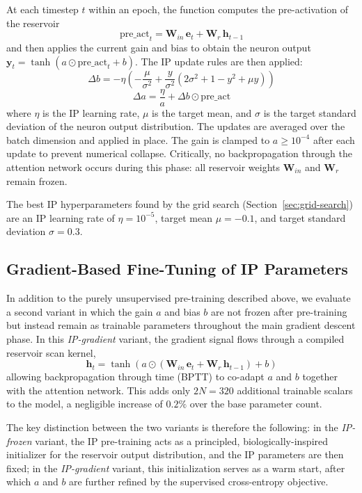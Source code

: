 \documentclass{sapthesis}
\begin{document}
At each timestep $t$ within an epoch, the function computes the pre-activation of the reservoir
\[
  \text{pre\_act}_t = \mathbf{W}_{in}\,\mathbf{e}_t + \mathbf{W}_r\,\mathbf{h}_{t-1}
\]
and then applies the current gain and bias to obtain the neuron output $\mathbf{y}_t = \tanh(a \odot \text{pre\_act}_t + b)$. The IP update rules are then applied:
\[
  \Delta b = -\eta \left(-\frac{\mu}{\sigma^2} + \frac{y}{\sigma^2}\left(2\sigma^2 + 1 - y^2 + \mu y\right)\right)
\]
\[
  \Delta a = \frac{\eta}{a} + \Delta b \odot \text{pre\_act}
\]
where $\eta$ is the IP learning rate, $\mu$ is the target mean, and $\sigma$ is the target standard deviation of the neuron output distribution. The updates are averaged over the batch dimension and applied in place. The gain is clamped to $a \geq 10^{-4}$ after each update to prevent numerical collapse. Critically, no backpropagation through the attention network occurs during this phase: all reservoir weights $\mathbf{W}_{in}$ and $\mathbf{W}_r$ remain frozen.

The best IP hyperparameters found by the grid search (Section~\ref{sec:grid-search}) are an IP learning rate of $\eta = 10^{-5}$, target mean $\mu = -0.1$, and target standard deviation $\sigma = 0.3$.

\subsection{Gradient-Based Fine-Tuning of IP Parameters}
In addition to the purely unsupervised pre-training described above, we evaluate a second variant in which the gain $a$ and bias $b$ are not frozen after pre-training but instead remain as trainable parameters throughout the main gradient descent phase. In this \textit{IP-gradient} variant, the gradient signal flows through a compiled reservoir scan kernel,
\[
  \mathbf{h}_t = \tanh(a \odot (\mathbf{W}_{in}\,\mathbf{e}_t + \mathbf{W}_r\,\mathbf{h}_{t-1}) + b)
\]
allowing backpropagation through time (BPTT) to co-adapt $a$ and $b$ together with the attention network. This adds only $2N = 320$ additional trainable scalars to the model, a negligible increase of $0.2\%$ over the base parameter count.

The key distinction between the two variants is therefore the following: in the \textit{IP-frozen} variant, the IP pre-training acts as a principled, biologically-inspired initializer for the reservoir output distribution, and the IP parameters are then fixed; in the \textit{IP-gradient} variant, this initialization serves as a warm start, after which $a$ and $b$ are further refined by the supervised cross-entropy objective.
\end{document}
